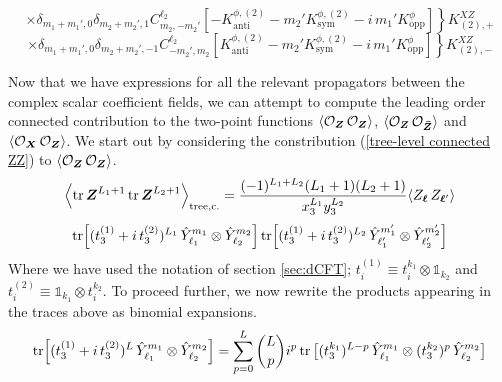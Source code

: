 %
%
\begin{equation*}
\times
\delta_{m_1 + m_1',0} \delta_{m_2 + m_2',1} C^{\ell_2}_{m_2,-m_2'}
\left.
\left[
-
K^{\phi,(2)}_{\text{anti}}
-
m_2' K^{\phi,(2)}_{\text{sym}}
-
i \, m_1' K^{\phi}_{\text{opp}}
\right]
\right\rbrace { \scriptstyle K^{XZ}_{(2),+} }
\end{equation*}
%
%
\begin{equation}\label{XZ propagotor}
\times
\delta_{m_1 + m_1',0} \delta_{m_2 + m_2',-1} C^{\ell_2}_{-m_2',m_2}
\left.
\left[
K^{\phi,(2)}_{\text{anti}}
-
m_2' K^{\phi,(2)}_{\text{sym}}
-
i \, m_1' K^{\phi}_{\text{opp}}
\right]
\right\rbrace { \scriptstyle K^{XZ}_{(2),-} }
\end{equation}
%
%

\newpage
Now that we have expressions for all the relevant propagators between the complex scalar coefficient fields, we can attempt to compute the leading order connected contribution to the two-point functions $\expval{\mathcal{O}_{\boldsymbol{Z}} \, \mathcal{O}_{\boldsymbol{Z}}}$, $\expval{\mathcal{O}_{\boldsymbol{Z}} \, \mathcal{O}_{\boldsymbol{\bar{Z}}}}$ and $\expval{\mathcal{O}_{\boldsymbol{X}} \, \mathcal{O}_{\boldsymbol{Z}}}$. We start out by considering the constribution (\ref{tree-level connected ZZ}) to $\expval{\mathcal{O}_{\boldsymbol{Z}} \, \mathcal{O}_{\boldsymbol{Z}}}$.
%
%
\begin{equation*}
\expval{\tr \boldsymbol{Z}^{L_1+1} \tr \boldsymbol{Z}^{L_2+1}}_{\mathrm{tree,c.}}
=
\frac{(-1)^{L_1 + L_2} (L_1+1) (L_2+1)}{x_3^{L_1} y_3^{L_2}}
\langle
Z_{\boldsymbol{\ell}} \, Z_{\boldsymbol{\ell}'}
\rangle
\end{equation*}
%
%
\begin{equation}\label{ZZ c. two-point}
\tr[(t^{(1)}_3 + i \, t^{(2)}_3)^{L_1} \, \hat{Y}_{\ell_1}^{m_1} \otimes \hat{Y}_{\ell_2}^{m_2}]
\tr[(t^{(1)}_3 + i \, t^{(2)}_3)^{L_2} \, \hat{Y}_{\ell_1'}^{m_1'} \otimes \hat{Y}_{\ell_2'}^{m_2'}]
\end{equation}
%
%
Where we have used the notation of section \ref{sec:dCFT}; $t^{(1)}_i \equiv t^{k_1}_i \otimes \mathbb{1}_{k_2}$ and $t^{(2)}_i \equiv \mathbb{1}_{k_1} \otimes t^{k_2}_i$. To proceed further, we now rewrite the products appearing in the traces above as binomial expansions.
%
%
\begin{equation}\label{binomial sum}
\tr[(t^{(1)}_3 + i \, t^{(2)}_3)^{L} \, \hat{Y}_{\ell_1}^{m_1} \otimes \hat{Y}_{\ell_2}^{m_2}]
=
\sum_{p=0}^{L}
\binom{L}{p} i^{p}
\tr \big[ (t_3^{k_1})^{L - p} \, \hat{Y}_{\ell_1}^{m_1} \otimes (t_3^{k_2})^{p} \, \hat{Y}_{\ell_2}^{m_2} \big]
\end{equation}
